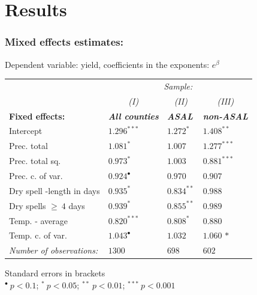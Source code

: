 \documentclass{beamer}              %
\begin{document}
\section{Results}

\begin{frame}

\frametitle{Mixed effects estimates:}\label{Results} 
{\begin{threeparttable}
\begin{footnotesize}
\caption*{\small Dependent variable: yield, coefficients in the exponents: $\mathit{e}^{\beta}$}
\label{KenARe11_exponents} 
\begin{tabular}{llll}\hline
&\multicolumn{3}{c}{\textit{Sample:}}\\
&\multicolumn{1}{c}{\textit{(I)}}&\multicolumn{1}{c}{\textit{(II)}}&\multicolumn{1}{c}{\textit{(III)}}\\
  \textbf{Fixed effects:}&\textit{\textbf{All counties}}&\textit{\textbf{ASAL}}&\textit{\textbf{non-ASAL}}\\
  \hline
\vspace{-0.2cm}Intercept&$1.296^{***}$&$1.272^{*}$&$1.408^{**}$\\
 \vspace{-0.2cm}Prec. total&$1.081^{*}$&$1.007^{}$&$1.277^{***}$\\
  \vspace{-0.2cm}Prec. total sq.&$0.973^{*}$&$1.003$&$0.881^{***}$\\
 \vspace{-0.2cm}Prec. c. of var.&$0.924^{\bullet}$&$0.970$ &$0.907^{}$\\
 \vspace{-0.2cm}Dry spell -length in days&$0.935^{*}$&$0.834^{**}$&$ 0.988^{}$\\
 \vspace{-0.2cm}Dry spells $\geq~4$ days\tnote{b}&$0.939^{*}$&$0.855^{**}$&$0.989^{}$\\
 \vspace{-0.2cm}Temp. - average&$0.820^{***}$&$0.808^{*}$&$0.880$ $^{}$\\
 \vspace{-0.2cm}Temp. c. of var.&$1.043^{\bullet}$&$1.032$&$1.060$ ${*}$\\[2mm]
  \hline
\textit{Number of observations:}  &$1300$&$698$&$602$
\\
\end{tabular} 
 \begin{tablenotes}
  \begin{footnotesize}
  \item Standard errors in brackets \\
    $^{\bullet}~p<0.1$; $^{*}~p<0.05$; $^{**}~p<0.01$; $^{***}~p<0.001$
  \end{footnotesize}
\end{tablenotes}
\end{footnotesize}
  \end{threeparttable}\par }
\end{frame}
\end{document}
